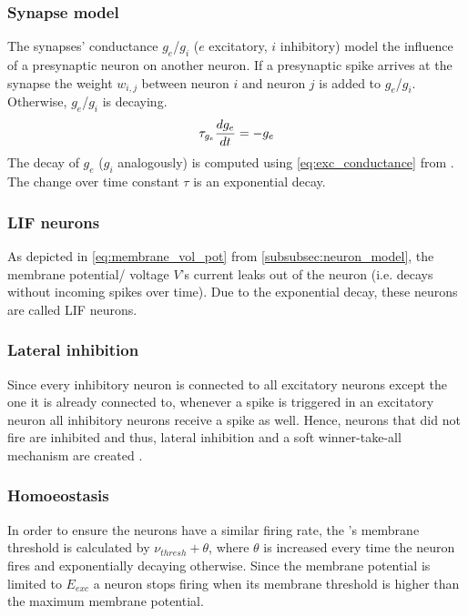 \subsubsection{Synapse model}
\label{subsubsec:synapse_model}
The synapses' conductance $g_e$/$g_i$ ($e$ excitatory, $i$ inhibitory) model the influence of a presynaptic neuron on another neuron.
If a presynaptic spike arrives at the synapse the weight $w_{i,j}$ between neuron $i$ and neuron $j$ is added to $g_e$/$g_i$.
Otherwise, $g_e$/$g_i$ is decaying.
%
\begin{equation}
    \centering
    \label{eq:exc_conductance}
    \tau_{g_e} \frac{dg_e}{dt} = - g_e
\end{equation}
%
The decay of $g_e$ ($g_i$ analogously) is computed using \autoref{eq:exc_conductance} from \cite{SNN}.
The change over time constant $\tau$ is an exponential decay.


\subsubsection{\ac{LIF} neurons}
As depicted in \autoref{eq:membrane_vol_pot} from \autoref{subsubsec:neuron_model}, the membrane potential/ voltage $V$'s current leaks out of the neuron 
(i.e. decays without incoming spikes over time).
Due to the exponential decay, these neurons are called \ac{LIF} neurons.


\subsubsection{Lateral inhibition}
Since every inhibitory neuron is connected to all excitatory neurons except the one it is already connected to, 
whenever a spike is triggered in an excitatory neuron all inhibitory neurons receive a spike as well.
Hence, neurons that did not fire are inhibited and thus, lateral inhibition and a soft winner-take-all mechanism are created \cite{SNN}.


\subsubsection{Homoeostasis}
In order to ensure the neurons have a similar firing rate, the \eN{}'s membrane threshold is calculated by $\nu_{thresh} + \theta$, 
where $\theta$ is increased every time the neuron fires and exponentially decaying otherwise.
Since the membrane potential is limited to $E_{exc}$ a neuron stops firing when its membrane threshold is higher than the maximum membrane potential.

